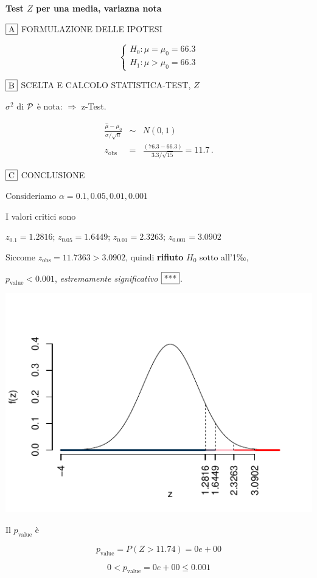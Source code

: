 \documentclass[
  11pt,
]{book}
\theoremstyle{mytheoremstyle}
\theoremstyle{mydefstyle}
\newenvironment{sol}
  {
  \begin{tcolorbox}[enhanced,breakable,arc=0.1mm,boxrule=1pt,colback=white,colframe=iblue,
  title=\bf \fontfamily{lmss}\selectfont \hspace{.5 cm} Soluzione,drop fuzzy shadow]

}{
\end{tcolorbox}
  }
\begin{document}
\begin{sol}
\textbf{Test \(Z\) per una media, variazna nota}

\(\fbox{A}\) FORMULAZIONE DELLE IPOTESI

\[\begin{cases}
   H_0: \mu = \mu_0=66.3 \\
   H_1: \mu > \mu_0=66.3 
   \end{cases}\]

\(\fbox{B}\) SCELTA E CALCOLO STATISTICA-TEST, \(Z\)

\(\sigma^{2}\) di \(\cal{P}\) è nota: \(\Rightarrow\) z-Test.

\begin{eqnarray*}
   \frac{\hat\mu - \mu_{0}} {\sigma/\sqrt{n}}&\sim&N(0,1)\\
   z_{\text{obs}}
   &=& \frac{ ( 76.3 -  66.3 )} { 3.3 /\sqrt{ 15 }}
   =   11.7 \, .
   \end{eqnarray*}

\(\fbox{C}\) CONCLUSIONE

Consideriamo \(\alpha=0.1, 0.05, 0.01, 0.001\)

I valori critici sono

\(z_{0.1}=1.2816\); \(z_{0.05}=1.6449\); \(z_{0.01}=2.3263\); \(z_{0.001}=3.0902\)

Siccome \(z_\text{obs}=11.7363>3.0902\), quindi \textbf{rifiuto} \(H_0\) sotto all'1‰,

\(p_\text{value}<0.001\), \emph{estremamente significativo} \(\fbox{***}\).

\begin{center}\includegraphics{Esami_passati_con_soluzioni_files/figure-latex/2022-72-1} \end{center}

Il \(p_{\text{value}}\) è

\[ p_{\text{value}} = P(Z>11.74)=0e+00 \]

\[
 0 < p_\text{value}= 0e+00 \leq 0.001 
\]

\end{sol}
\end{document}
